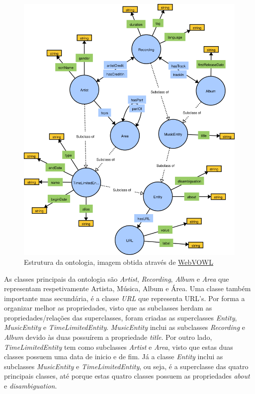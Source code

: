 \documentclass{article}
\begin{document}
\begin{figure}[H]
    \centering
    \includegraphics[width=15cm]{Pictures/ontologySctructure.png}
    \caption{Estrutura da ontologia, imagem obtida através de \protect\href{http://www.visualdataweb.de/webvowl/}{WebVOWL}}
\end{figure}

As classes principais da ontologia são \textit{Artist}, \textit{Recording}, \textit{Album} e \textit{Area} que representam respetivamente Artista, Música, Album e Área. Uma classe também importante mas secundária, é a classe \textit{URL} que representa URL's. Por forma a organizar melhor as propriedades, visto que as subclasses herdam as propriedades/relações das superclasses, foram criadas as superclasses \textit{Entity}, \textit{MusicEntity} e \textit{TimeLimitedEntity}. \textit{MusicEntity} inclui as subclasses \textit{Recording} e \textit{Album} devido às duas possuírem a propriedade \textit{title}. Por outro lado, \textit{TimeLimitedEntity} tem como subclasses \textit{Artist} e \textit{Area}, visto que estas duas classes possuem uma data de inicio e de fim. Já a classe \textit{Entity} inclui as subclasses \textit{MusicEntity} e \textit{TimeLimitedEntity}, ou seja, é a superclasse das quatro principais classes, até porque estas quatro classes possuem as propriedades \textit{about} e \textit{disambiguation}.
\end{document}
